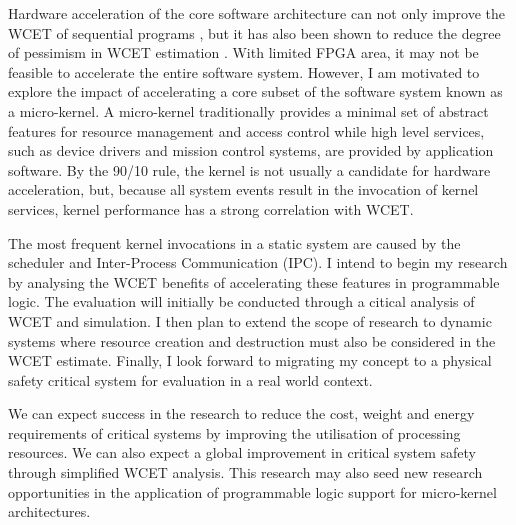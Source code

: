 Hardware acceleration of the core software architecture can not only improve the WCET of sequential
programs \cite{warp, micro_hyp}, but it has also 
been shown to reduce the degree of pessimism in WCET estimation \cite{aud_hardimp}.
With limited FPGA area, it may not be feasible to
accelerate the entire software system. However, I am motivated to explore the impact of accelerating a
core subset of the software system known as a micro-kernel. A micro-kernel traditionally provides a minimal
set of abstract features for resource management and access control while high level services, such as
device drivers and mission control systems, are provided by application software.
By the 90/10 rule, the kernel is not usually a candidate for hardware acceleration, but, because all
system events result in the invocation of kernel services, kernel performance has a strong correlation
with WCET.

The most frequent kernel invocations in a static system are caused by the scheduler and Inter-Process
Communication (IPC). I intend to begin my research by analysing the WCET benefits of accelerating these
features in programmable logic. The evaluation will initially be conducted through a citical analysis of
WCET and simulation. I then plan to extend the scope of research to dynamic
systems where resource creation and destruction must also be considered in the WCET estimate. Finally,
I look forward to migrating my concept to a physical safety critical system for evaluation in a real
world context.

We can expect success in the research to reduce the cost, weight and energy requirements of critical
systems by improving the utilisation of processing resources. We can also expect a global improvement
in critical system safety through simplified WCET analysis. This research may also seed new research
opportunities in the application of programmable logic support for micro-kernel architectures.



%



